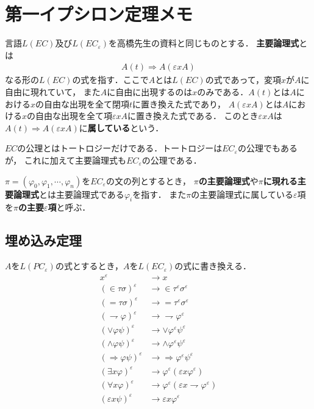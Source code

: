 \section{第一イプシロン定理メモ}
	
	言語$L(EC)$及び$L(EC_{\varepsilon})$を高橋先生の資料と同じものとする．
	{\bf 主要論理式}とは
	\begin{align}
		A(t) \Longrightarrow A(\varepsilon x A)
	\end{align}
	なる形の$L(EC)$の式を指す．ここで$A$とは$L(EC)$の式であって，変項$x$が$A$に自由に現れていて，
	また$A$に自由に出現するのは$x$のみである．$A(t)$とは$A$における$x$の自由な出現を全て閉項$t$に置き換えた式であり，
	$A(\varepsilon x A)$とは$A$における$x$の自由な出現を全て項$\varepsilon x A$に置き換えた式である．
	このとき$\varepsilon x A$は$A(t) \Longrightarrow A(\varepsilon x A)$に{\bf 属している}という．
	
	$EC$の公理とはトートロジーだけである．トートロジーは$EC_{\varepsilon}$の公理でもあるが，
	これに加えて主要論理式も$EC_{\varepsilon}$の公理である．
	
	$\pi = (\varphi_{0},\varphi_{1},\cdots,\varphi_{n})$を$EC_{\varepsilon}$の文の列とするとき，
	{\bf $\pi$の主要論理式}や{\bf $\pi$に現れる主要論理式}とは主要論理式である$\varphi_{i}$を指す．
	また$\pi$の主要論理式に属している$\varepsilon$項を{\bf $\pi$の主要$\varepsilon$項}と呼ぶ．
	
\subsection{埋め込み定理}
	$A$を$L(PC_{\varepsilon})$の式とするとき，$A$を$L(EC_{\varepsilon})$の式に書き換える．
	\begin{align}
		x^{\varepsilon} &\rightarrow x \\
		(\in \tau \sigma)^{\varepsilon} &\rightarrow \in \tau^{\varepsilon} \sigma^{\varepsilon} \\
		(= \tau \sigma)^{\varepsilon} &\rightarrow = \tau^{\varepsilon} \sigma^{\varepsilon} \\
		(\rightharpoondown \varphi)^{\varepsilon} &\rightarrow \rightharpoondown \varphi^{\varepsilon} \\
		(\vee \varphi \psi)^{\varepsilon} &\rightarrow \vee \varphi^{\varepsilon} \psi^{\varepsilon} \\
		(\wedge \varphi \psi)^{\varepsilon} &\rightarrow \wedge \varphi^{\varepsilon} \psi^{\varepsilon} \\
		(\Longrightarrow \varphi \psi)^{\varepsilon} &\rightarrow \Longrightarrow \varphi^{\varepsilon} \psi^{\varepsilon} \\
		(\exists x \varphi)^{\varepsilon} &\rightarrow \varphi^{\varepsilon}(\varepsilon x \varphi^{\varepsilon}) \\
		(\forall x \varphi)^{\varepsilon} &\rightarrow \varphi^{\varepsilon}(\varepsilon x \rightharpoondown \varphi^{\varepsilon}) \\
		(\varepsilon x \psi)^{\varepsilon} &\rightarrow \varepsilon x \varphi^{\varepsilon}
	\end{align}
	
